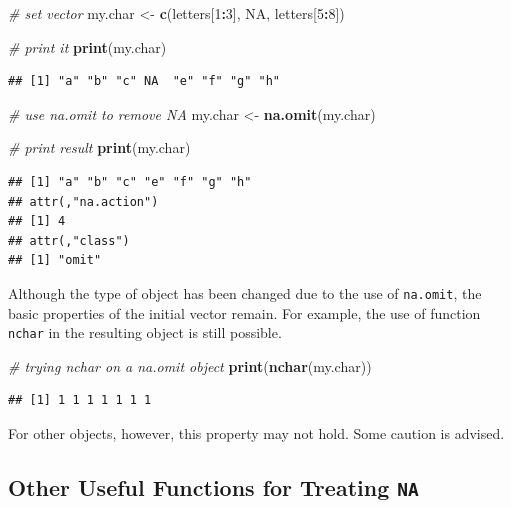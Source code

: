 \documentclass[11pt,]{book}
\newenvironment{Shaded}{\begin{snugshade}}{\end{snugshade}}
\newcommand{\KeywordTok}[1]{\textcolor[rgb]{0.27,0.27,0.27}{\textbf{#1}}}
\newcommand{\DecValTok}[1]{\textcolor[rgb]{0.06,0.06,0.06}{#1}}
\newcommand{\StringTok}[1]{\textcolor[rgb]{0.5,0.5,0.5}{#1}}
\newcommand{\CommentTok}[1]{\textcolor[rgb]{0.56,0.35,0.01}{\textit{#1}}}
\newcommand{\OtherTok}[1]{\textcolor[rgb]{0.56,0.35,0.01}{#1}}
\newcommand{\OperatorTok}[1]{\textcolor[rgb]{0.81,0.36,0.00}{\textbf{#1}}}
\newcommand{\NormalTok}[1]{#1}
\begin{document}
\begin{Shaded}
\begin{Highlighting}[]
\CommentTok{# set vector}
\NormalTok{my.char <-}\StringTok{ }\KeywordTok{c}\NormalTok{(letters[}\DecValTok{1}\OperatorTok{:}\DecValTok{3}\NormalTok{], }\OtherTok{NA}\NormalTok{, letters[}\DecValTok{5}\OperatorTok{:}\DecValTok{8}\NormalTok{])}

\CommentTok{# print it}
\KeywordTok{print}\NormalTok{(my.char)}
\end{Highlighting}
\end{Shaded}

\begin{verbatim}
## [1] "a" "b" "c" NA  "e" "f" "g" "h"
\end{verbatim}

\begin{Shaded}
\begin{Highlighting}[]
\CommentTok{# use na.omit to remove NA}
\NormalTok{my.char <-}\StringTok{ }\KeywordTok{na.omit}\NormalTok{(my.char)}

\CommentTok{# print result}
\KeywordTok{print}\NormalTok{(my.char)}
\end{Highlighting}
\end{Shaded}

\begin{verbatim}
## [1] "a" "b" "c" "e" "f" "g" "h"
## attr(,"na.action")
## [1] 4
## attr(,"class")
## [1] "omit"
\end{verbatim}

Although the type of object has been changed due to the use of
\texttt{na.omit}, the basic properties of the initial vector remain. For
example, the use of function \texttt{nchar} in the resulting object is
still possible.

\begin{Shaded}
\begin{Highlighting}[]
\CommentTok{# trying nchar on a na.omit object}
\KeywordTok{print}\NormalTok{(}\KeywordTok{nchar}\NormalTok{(my.char))}
\end{Highlighting}
\end{Shaded}

\begin{verbatim}
## [1] 1 1 1 1 1 1 1
\end{verbatim}

For other objects, however, this property may not hold. Some caution is
advised.

\subsection{\texorpdfstring{Other Useful Functions for Treating
\texttt{NA}}{Other Useful Functions for Treating NA}}\label{other-useful-functions-for-treating-na}
\end{document}

